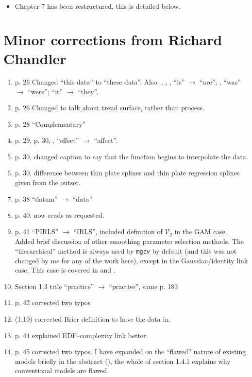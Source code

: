 \begin{itemize}
\item Chapter 7 has been restructured, this is detailed below.
\end{itemize}


\section{Minor corrections from Richard Chandler}
\label{richard}

\begin{enumerate}
\item p. 26 Changed ``this data'' to ``these data''. Also: , , ,  ``is'' $\rightarrow$ ``are''; ,  ``was'' $\rightarrow$ ``were'';  ``it'' $\rightarrow$ ``they''.
\item p. 26 Changed to talk about trend surface, rather than process.
\item p. 28 ``Complementary''
\item p. 29, p. 30, ,  ``effect'' $\rightarrow$ ``affect''.
\item p. 30, changed caption to say that the function begins to interpolate the data.
\item p. 30, difference between thin plate splines and thin plate regression splines given from the outset.
\item p. 38 ``datum'' $\rightarrow$ ``data''
\item p. 40. now reads as requested.
\item p. 41 ``PIRLS'' $\rightarrow$ ``IRLS'', included definition of $\mathcal{V}_g$ in the GAM case.  Added brief discussion of other smoothing parameter selection methods. The ``hierarchical'' method is always used by \texttt{mgcv} by default (and this was not changed by me for any of the work here), except in the Gaussian/identity link case. This case is covered in  and .
\item Section 1.3 title ``practice'' $\rightarrow$ ``practise'', same p. 183
\item p. 42 corrected two typos
\item (1.10) corrected Brier definition to have the data in.
\item p. 44 explained EDF--complexity link better.
\item p. 45 corrected two typos. I have expanded on the ``flawed'' nature of existing models briefly in the abstract (), the whole of section 1.4.1 explains why conventional models are flawed.

\end{enumerate}
